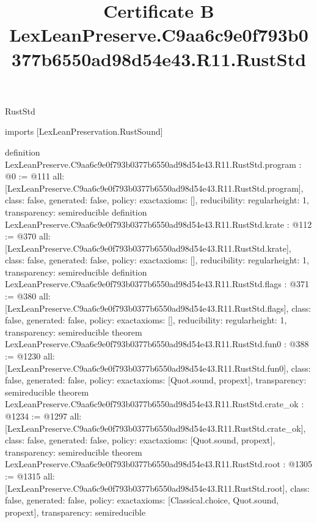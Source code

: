 \begin{lexlean}{RustStd}
\title{Certificate B LexLeanPreserve.C9aa6c9e0f793b0377b6550ad98d54e43.R11.RustStd}
\begin{coremodule}
imports [LexLeanPreservation.RustSound]

definition LexLeanPreserve.C9aa6c9e0f793b0377b6550ad98d54e43.R11.RustStd.program : @0 := @111 {
  all: [LexLeanPreserve.C9aa6c9e0f793b0377b6550ad98d54e43.R11.RustStd.program],
  class: false,
  generated: false,
  policy: exact{axioms: []},
  reducibility: regular{height: 1},
  transparency: semireducible
}
definition LexLeanPreserve.C9aa6c9e0f793b0377b6550ad98d54e43.R11.RustStd.krate : @112 := @370 {
  all: [LexLeanPreserve.C9aa6c9e0f793b0377b6550ad98d54e43.R11.RustStd.krate],
  class: false,
  generated: false,
  policy: exact{axioms: []},
  reducibility: regular{height: 1},
  transparency: semireducible
}
definition LexLeanPreserve.C9aa6c9e0f793b0377b6550ad98d54e43.R11.RustStd.flags : @371 := @380 {
  all: [LexLeanPreserve.C9aa6c9e0f793b0377b6550ad98d54e43.R11.RustStd.flags],
  class: false,
  generated: false,
  policy: exact{axioms: []},
  reducibility: regular{height: 1},
  transparency: semireducible
}
theorem LexLeanPreserve.C9aa6c9e0f793b0377b6550ad98d54e43.R11.RustStd.fun0 : @388 := @1230 {
  all: [LexLeanPreserve.C9aa6c9e0f793b0377b6550ad98d54e43.R11.RustStd.fun0],
  class: false,
  generated: false,
  policy: exact{axioms: [Quot.sound, propext]},
  transparency: semireducible
}
theorem LexLeanPreserve.C9aa6c9e0f793b0377b6550ad98d54e43.R11.RustStd.crate_ok : @1234 := @1297 {
  all: [LexLeanPreserve.C9aa6c9e0f793b0377b6550ad98d54e43.R11.RustStd.crate_ok],
  class: false,
  generated: false,
  policy: exact{axioms: [Quot.sound, propext]},
  transparency: semireducible
}
theorem LexLeanPreserve.C9aa6c9e0f793b0377b6550ad98d54e43.R11.RustStd.root : @1305 := @1315 {
  all: [LexLeanPreserve.C9aa6c9e0f793b0377b6550ad98d54e43.R11.RustStd.root],
  class: false,
  generated: false,
  policy: exact{axioms: [Classical.choice, Quot.sound, propext]},
  transparency: semireducible
}


\end{coremodule}
\end{lexlean}
